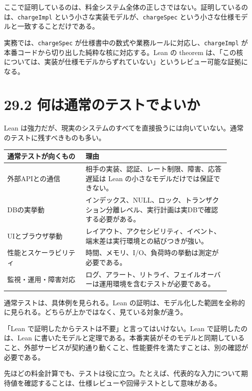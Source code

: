 ここで証明しているのは、料金システム全体の正しさではない。証明しているのは、\texttt{chargeImpl} という小さな実装モデルが、\texttt{chargeSpec} という小さな仕様モデルと一致することだけである。

\begin{softwarebox}
実務では、\texttt{chargeSpec} が仕様書中の数式や業務ルールに対応し、\texttt{chargeImpl} が本番コードから切り出した純粋な核に対応する。Lean の theorem は、「この核については、実装が仕様モデルからずれていない」というレビュー可能な証拠になる。
\end{softwarebox}

\section{29.2 何は通常のテストでよいか}

Lean は強力だが、現実のシステムのすべてを直接扱うには向いていない。通常のテストに残すべきものも多い。

\begin{longtable}{p{0.32\linewidth}p{0.59\linewidth}}
\toprule
\textbf{通常テストが向くもの} & \textbf{理由} \\
\midrule
外部APIとの通信 & 相手の実装、認証、レート制限、障害、応答遅延は Lean の小さなモデルだけでは保証できない。 \\
DBの実挙動 & インデックス、NULL、ロック、トランザクション分離レベル、実行計画は実DBで確認する必要がある。 \\
UIとブラウザ挙動 & レイアウト、アクセシビリティ、イベント、端末差は実行環境との結びつきが強い。 \\
性能とスケーラビリティ & 時間、メモリ、I/O、負荷時の挙動は測定が必要である。 \\
監視・運用・障害対応 & ログ、アラート、リトライ、フェイルオーバーは運用環境を含むテストが必要である。 \\
\bottomrule
\end{longtable}

通常テストは、具体例を見られる。Lean の証明は、モデル化した範囲を全称的に見られる。どちらが上かではなく、見ている対象が違う。

\begin{warningbox}
「Lean で証明したからテストは不要」と言ってはいけない。Lean で証明したのは、Lean に書いたモデルと定理である。本番実装がそのモデルと同期していること、外部サービスが契約通り動くこと、性能要件を満たすことは、別の確認が必要である。
\end{warningbox}

先ほどの料金計算でも、テストは役に立つ。たとえば、代表的な入力について期待値を確認することは、仕様レビューや回帰テストとして意味がある。

